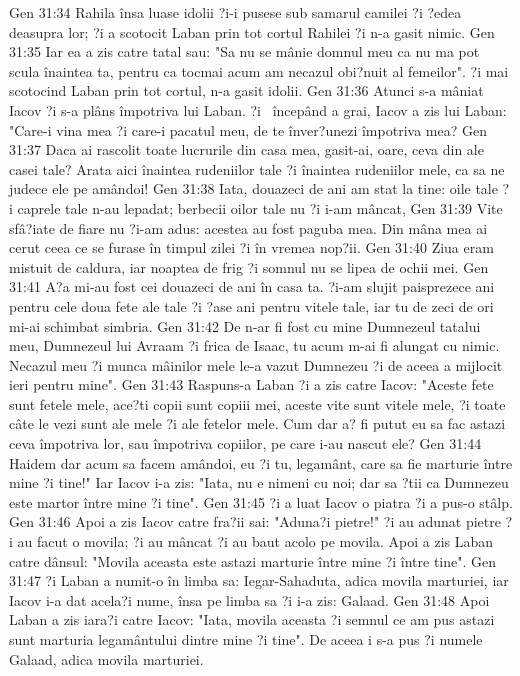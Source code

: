 Gen 31:34  Rahila însa luase idolii ?i-i pusese sub samarul camilei ?i ?edea deasupra lor; ?i a scotocit Laban prin tot cortul Rahilei ?i n-a gasit nimic.
Gen 31:35  Iar ea a zis catre tatal sau: "Sa nu se mânie domnul meu ca nu ma pot scula înaintea ta, pentru ca tocmai acum am necazul obi?nuit al femeilor". ?i mai scotocind Laban prin tot cortul, n-a gasit idolii.
Gen 31:36  Atunci s-a mâniat Iacov ?i s-a plâns împotriva lui Laban. ?i  începând a grai, Iacov a zis lui Laban: "Care-i vina mea ?i care-i pacatul meu, de te înver?unezi împotriva mea?
Gen 31:37  Daca ai rascolit toate lucrurile din casa mea, gasit-ai, oare, ceva din ale casei tale? Arata aici înaintea rudeniilor tale ?i înaintea rudeniilor mele, ca sa ne judece ele pe amândoi!
Gen 31:38  Iata, douazeci de ani am stat la tine: oile tale ?i caprele tale n-au lepadat; berbecii oilor tale nu ?i i-am mâncat,
Gen 31:39  Vite sfâ?iate de fiare nu ?i-am adus: acestea au fost paguba mea. Din mâna mea ai cerut ceea ce se furase în timpul zilei ?i în vremea nop?ii.
Gen 31:40  Ziua eram mistuit de caldura, iar noaptea de frig ?i somnul nu se lipea de ochii mei.
Gen 31:41  A?a mi-au fost cei douazeci de ani în casa ta. ?i-am slujit paisprezece ani pentru cele doua fete ale tale ?i ?ase ani pentru vitele tale, iar tu de zeci de ori mi-ai schimbat simbria.
Gen 31:42  De n-ar fi fost cu mine Dumnezeul tatalui meu, Dumnezeul lui Avraam ?i frica de Isaac, tu acum m-ai fi alungat cu nimic. Necazul meu ?i munca mâinilor mele le-a vazut Dumnezeu ?i de aceea a mijlocit ieri pentru mine".
Gen 31:43  Raspuns-a Laban ?i a zis catre Iacov: "Aceste fete sunt fetele mele, ace?ti copii sunt copiii mei, aceste vite sunt vitele mele, ?i toate câte le vezi sunt ale mele ?i ale fetelor mele. Cum dar a? fi putut eu sa fac astazi ceva împotriva lor, sau împotriva copiilor, pe care i-au nascut ele?
Gen 31:44  Haidem dar acum sa facem amândoi, eu ?i tu, legamânt, care sa fie marturie între mine ?i tine!" Iar Iacov i-a zis: "Iata, nu e nimeni cu noi; dar sa ?tii ca Dumnezeu este martor între mine ?i tine".
Gen 31:45  ?i a luat Iacov o piatra ?i a pus-o stâlp.
Gen 31:46  Apoi a zis Iacov catre fra?ii sai: "Aduna?i pietre!" ?i au adunat pietre ?i au facut o movila; ?i au mâncat ?i au baut acolo pe movila. Apoi a zis Laban catre dânsul: "Movila aceasta este astazi marturie între mine ?i între tine".
Gen 31:47  ?i Laban a numit-o în limba sa: Iegar-Sahaduta, adica movila marturiei, iar Iacov i-a dat acela?i nume, însa pe limba sa ?i i-a zis: Galaad.
Gen 31:48  Apoi Laban a zis iara?i catre Iacov: "Iata, movila aceasta ?i semnul ce am pus astazi sunt marturia legamântului dintre mine ?i tine". De aceea i s-a pus ?i numele Galaad, adica movila marturiei.
